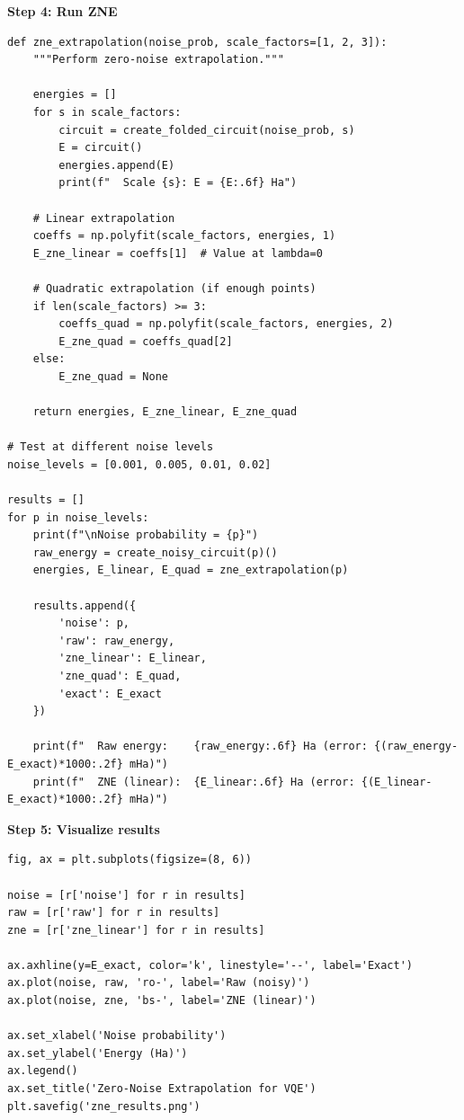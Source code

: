 \documentclass[11pt,a4paper]{article}
\begin{document}
\textbf{Step 4: Run ZNE}
\begin{lstlisting}
def zne_extrapolation(noise_prob, scale_factors=[1, 2, 3]):
    """Perform zero-noise extrapolation."""
    
    energies = []
    for s in scale_factors:
        circuit = create_folded_circuit(noise_prob, s)
        E = circuit()
        energies.append(E)
        print(f"  Scale {s}: E = {E:.6f} Ha")
    
    # Linear extrapolation
    coeffs = np.polyfit(scale_factors, energies, 1)
    E_zne_linear = coeffs[1]  # Value at lambda=0
    
    # Quadratic extrapolation (if enough points)
    if len(scale_factors) >= 3:
        coeffs_quad = np.polyfit(scale_factors, energies, 2)
        E_zne_quad = coeffs_quad[2]
    else:
        E_zne_quad = None
    
    return energies, E_zne_linear, E_zne_quad

# Test at different noise levels
noise_levels = [0.001, 0.005, 0.01, 0.02]

results = []
for p in noise_levels:
    print(f"\nNoise probability = {p}")
    raw_energy = create_noisy_circuit(p)()
    energies, E_linear, E_quad = zne_extrapolation(p)
    
    results.append({
        'noise': p,
        'raw': raw_energy,
        'zne_linear': E_linear,
        'zne_quad': E_quad,
        'exact': E_exact
    })
    
    print(f"  Raw energy:    {raw_energy:.6f} Ha (error: {(raw_energy-E_exact)*1000:.2f} mHa)")
    print(f"  ZNE (linear):  {E_linear:.6f} Ha (error: {(E_linear-E_exact)*1000:.2f} mHa)")
\end{lstlisting}

\textbf{Step 5: Visualize results}
\begin{lstlisting}
fig, ax = plt.subplots(figsize=(8, 6))

noise = [r['noise'] for r in results]
raw = [r['raw'] for r in results]
zne = [r['zne_linear'] for r in results]

ax.axhline(y=E_exact, color='k', linestyle='--', label='Exact')
ax.plot(noise, raw, 'ro-', label='Raw (noisy)')
ax.plot(noise, zne, 'bs-', label='ZNE (linear)')

ax.set_xlabel('Noise probability')
ax.set_ylabel('Energy (Ha)')
ax.legend()
ax.set_title('Zero-Noise Extrapolation for VQE')
plt.savefig('zne_results.png')
\end{lstlisting}
\end{document}
